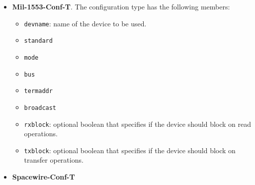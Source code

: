 \documentclass[11pt]{book}
\begin{document}
\begin{itemize}
The following line is a value that defines more parameters. This one is likely
to be used by the linux ethernet driver.
\begin{lstlisting}[frame=single]
{devname "eth0", address "10.1.11.87", version ipv4, port 2345}
\end{lstlisting}

The following line is a value that defines more parameters. This one is likely
to be used by the LEON ethernet driver.
\begin{lstlisting}[frame=single]
{devname "open_eth1", address "10.1.11.98", netmask "255.255.255.0", 
 gateway "10.1.11.250", dns "10.1.1.3", version ipv4, port 2345}
\end{lstlisting}

      \item
         \textbf{Mil-1553-Conf-T}. The configuration type has the following
         members:
         \begin{itemize}
            \item
               \texttt{devname}: name of the device to be used.

            \item
               \texttt{standard}

            \item
               \texttt{mode}

            \item
               \texttt{bus}

            \item
               \texttt{termaddr}

            \item
               \texttt{broadcast}

            \item
               \texttt{rxblock}: optional boolean that specifies if the device
               should block on read operations.
            \item
               \texttt{txblock}: optional boolean that specifies if the device
               should block on transfer operations.

         \end{itemize}

      \item
         \textbf{Spacewire-Conf-T}


\end{itemize}
\end{document}
